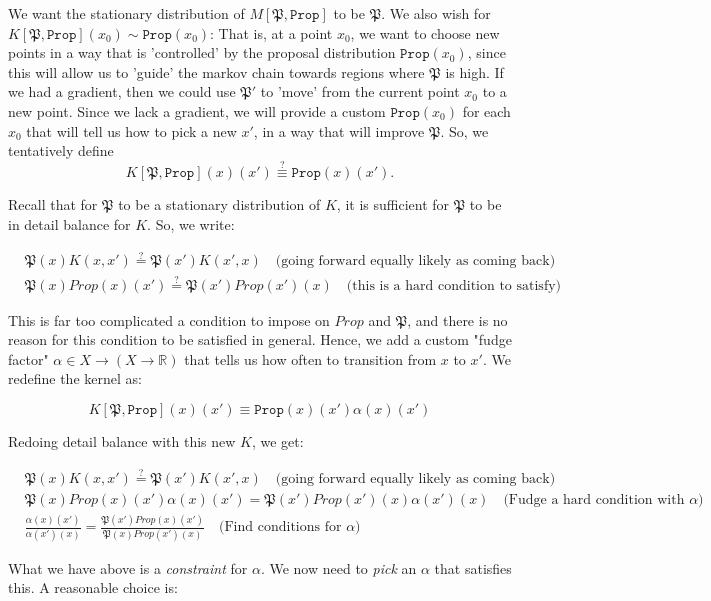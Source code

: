 \documentclass[titlepage]{article}
\newcommand{\R}{\mathbb{R}}
\renewcommand{\P}{\mathfrak{P}}
\newcommand{\Prop}{\texttt{Prop}}
\begin{document}
We want the stationary distribution of $M[\P, \Prop]$ to be $\P$. We also
wish for $K[\P, \Prop](x_0) \sim \Prop(x_0)$: That is, at a point $x_0$, we want
to choose new points in a way that is 'controlled' by the proposal distribution
$\Prop(x_0)$, since this will allow us to 'guide' the markov chain towards regions where $\P$ is high.
If we had a gradient, then we could use $\P'$ to 'move' from the current point
$x_0$ to a new point. Since we lack a gradient, we will provide a custom
$\Prop(x_0)$ for each $x_0$ that will tell us how to pick a new $x'$, in
a way that will improve $\P$.  So, we tentatively define
$$K[\P, \Prop](x)(x') \stackrel{?}{\equiv} \Prop(x)(x').$$

Recall that for $\P$ to be a stationary distribution of $K$, it is sufficient
for $\P$ to be in detail balance for $K$. So, we write:

\begin{align*}
&\P(x) K(x, x') \stackrel{?}{=}  \P(x') K(x', x) \quad \text{(going forward equally likely as coming back)} \\
&\P(x) Prop(x)(x') \stackrel{?}{=} \P(x') Prop(x')(x) \quad \text{(this is a hard condition to satisfy)}
\end{align*}

This is far too complicated a condition to impose on $Prop$ and $\P$, and there
is no reason for this condition to be satisfied in general. Hence,
we add a custom "fudge factor" $\alpha \in X \rightarrow (X \rightarrow \R)$
that tells us how often to transition
from $x$ to $x'$. We redefine the kernel as:

$$
K[\P, \Prop](x)(x') \equiv \Prop(x)(x') \alpha(x)(x')
$$

Redoing detail balance with this new $K$, we get:

\begin{align*}
&\P(x) K(x, x') \stackrel{?}{=}  \P(x') K(x', x) \quad \text{(going forward equally likely as coming back)} \\
&\P(x) Prop(x)(x') \alpha(x)(x') = \P(x') Prop(x')(x) \alpha(x')(x) \quad \text{(Fudge a hard condition with $\alpha$)} \\
&\frac{\alpha(x)(x')}{\alpha(x')(x)} = \frac{\P(x') Prop(x)(x') }{\P(x) Prop(x')(x)} \quad \text{(Find conditions for $\alpha$)}
\end{align*}

What we have above is a \emph{constraint} for $\alpha$. We now need to \emph{pick}
an $\alpha$ that satisfies this. A reasonable choice is:
\end{document}
